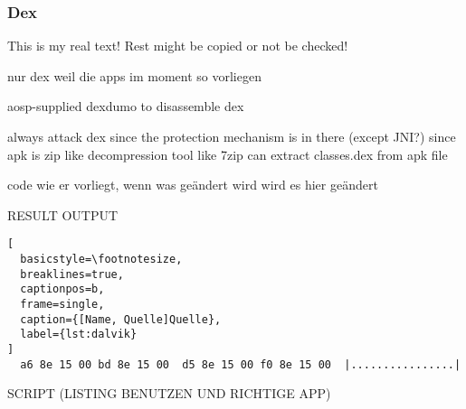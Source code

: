 \subsubsection{Dex} \label{subsubsection:tools-dex}
This is my real text! Rest might be copied or not be checked!


%
nur dex weil die apps im moment so vorliegen

aosp-supplied dexdumo to disassemble dex

\cite{andevconDalvikART}
%

%
always attack dex since the protection mechanism is in there (except JNI?)
since apk is zip like decompression tool like 7zip can extract classes.dex from apk file




code wie er vorliegt, wenn was geändert wird wird es hier geändert

RESULT OUTPUT

\begin{lstlisting}[
  basicstyle=\footnotesize,
  breaklines=true,
  captionpos=b,
  frame=single,
  caption={[Name, Quelle]Quelle},
  label={lst:dalvik}
]
  a6 8e 15 00 bd 8e 15 00  d5 8e 15 00 f0 8e 15 00  |................|
\end{lstlisting}

SCRIPT (LISTING BENUTZEN UND RICHTIGE APP)



